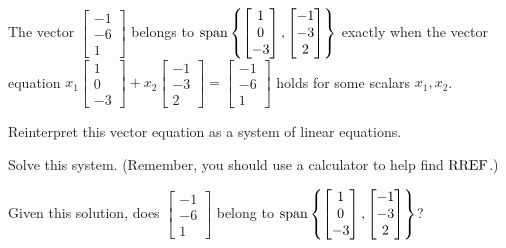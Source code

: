 


\begin{applicationActivities}



\begin{activity}{15}
  The vector
  \(\begin{bmatrix}-1\\-6\\1\end{bmatrix}\) belongs to
  \(\operatorname{span}\left\{\begin{bmatrix}1\\0\\-3\end{bmatrix},
  \begin{bmatrix}-1\\-3\\2\end{bmatrix}\right\}\) exactly when
  the vector equation
  \(x_1\begin{bmatrix}1\\0\\-3\end{bmatrix}+
  x_2\begin{bmatrix}-1\\-3\\2\end{bmatrix}
  =\begin{bmatrix}-1\\-6\\1\end{bmatrix}\) holds for some scalars
  \(x_1,x_2\).
  \begin{subactivity}
    Reinterpret this vector equation as a system of linear equations.
  \end{subactivity}

  \begin{subactivity}
    Solve this system. (Remember, you should use a calculator to help
    find \(\operatorname{RREF}\).)

  \end{subactivity}
  \begin{subactivity}
    Given this solution, does
    \(\begin{bmatrix}-1\\-6\\1\end{bmatrix}\) belong to
    \(\operatorname{span}\left\{\begin{bmatrix}1\\0\\-3\end{bmatrix},
    \begin{bmatrix}-1\\-3\\2\end{bmatrix}\right\}\)?
  \end{subactivity}
\end{activity}


\end{applicationActivities}
